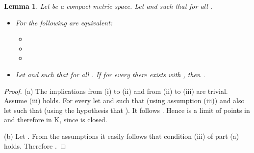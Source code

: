 \documentclass[microtype]{jloganal}
\theoremstyle{plain}
\newtheorem{lemma}[theorem]{Lemma}
\theoremstyle{definition}
\begin{document}
\begin{lemma}
\label{lem-xink}
Let  be a compact metric space.
Let  and 
such that  for all .
\begin{itemize}
\item[(a)] For  the following are equivalent:
\begin{itemize}
\item[(i)] 
\item[(ii)] 
\item[(iii)] 
\end{itemize}
\item[(b)] Let  and 
such that  for all .
If for every  there exists  with ,
then .
\end{itemize}
\end{lemma}
\begin{proof}
(a) The implications from (i) to (ii) and from (ii) to (iii) are trivial.
Assume (iii) holds. For every  let  and 
such that  (using assumption (iii)) and also let
 such that  (using the hypothesis that
).
It follows .
Hence  is a limit of points in  and therefore in K, since  is closed.

(b) Let . From the assumptions it easily follows that condition (iii)
of part (a) holds. Therefore .
\end{proof}
\end{document}

